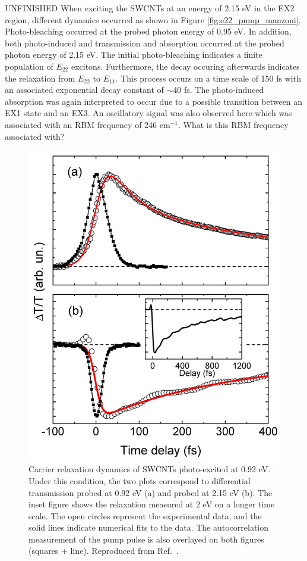 {\color{red} UNFINISHED} When exciting the SWCNTs at an energy of 2.15 eV in the EX2 region, different dynamics occurred as shown in Figure \ref{fig:e22_pump_manzoni}. Photo-bleaching occurred at the probed photon energy of 0.95 eV. In addition, both photo-induced and transmission and absorption occurred at the probed photon energy of 2.15 eV. The initial photo-bleaching indicates a finite population of $E_{22}$ excitons. Furthermore, the decay occuring afterwards indicates the relaxation from $E_{22}$ to $E_{11}$. This process occurs on a time scale of 150 fs with an associated exponential decay constant of $\sim$40 fs. The photo-induced absorption was again interpreted to occur due to a possible transition between an EX1 state and an EX3. An oscillatory signal was also observed here which was associated with an RBM frequency of 246 $\text{cm}^{-1}$. {\color{red} What is this RBM frequency associated with? }


\begin{figure}[H]
	\centering
	\includegraphics[scale=0.25]{images/chapter_prior_works/e11_pump_probe_manzoni}
	\caption{Carrier relaxation dynamics of SWCNTs photo-excited at 0.92 eV. Under this condition, the two plots correspond to differential transmission probed at 0.92 eV (a) and probed at 2.15 eV (b). The inset figure shows the relaxation measured at 2 eV on a longer time scale. The open circles represent the experimental data, and the solid lines indicate numerical fits to the data. The autocorrelation measurement of the pump pulse is also overlayed on both figures (squares + line). Reproduced from Ref.\ \cite{manzoni2005intersubband}.}
	\label{fig:e11_pump_manzoni}
\end{figure}


